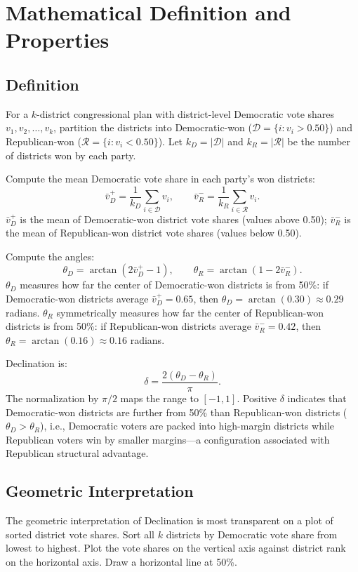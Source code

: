 \section{Mathematical Definition and Properties}
\label{sec:definition}

\subsection{Definition}

For a $k$-district congressional plan with district-level Democratic vote shares
$v_1, v_2, \ldots, v_k$, partition the districts into Democratic-won ($\mathcal{D} =
\{i : v_i > 0.50\}$) and Republican-won ($\mathcal{R} = \{i : v_i < 0.50\}$). Let
$k_D = |\mathcal{D}|$ and $k_R = |\mathcal{R}|$ be the number of districts won
by each party.

Compute the mean Democratic vote share in each party's won districts:
\[
\bar{v}_D^+ = \frac{1}{k_D}\sum_{i \in \mathcal{D}} v_i, \qquad
\bar{v}_R^- = \frac{1}{k_R}\sum_{i \in \mathcal{R}} v_i.
\]
$\bar{v}_D^+$ is the mean of Democratic-won district vote shares (values above 0.50);
$\bar{v}_R^-$ is the mean of Republican-won district vote shares (values below 0.50).

Compute the angles:
\[
\theta_D = \arctan(2\bar{v}_D^+ - 1), \qquad \theta_R = \arctan(1 - 2\bar{v}_R^-).
\]
$\theta_D$ measures how far the center of Democratic-won districts is from 50\%:
if Democratic-won districts average $\bar{v}_D^+ = 0.65$, then $\theta_D = \arctan(0.30)
\approx 0.29$ radians. $\theta_R$ symmetrically measures how far the center of
Republican-won districts is from 50\%: if Republican-won districts average
$\bar{v}_R^- = 0.42$, then $\theta_R = \arctan(0.16) \approx 0.16$ radians.

Declination is:
\[
\delta = \frac{2(\theta_D - \theta_R)}{\pi}.
\]
The normalization by $\pi/2$ maps the range to $[-1, 1]$. Positive $\delta$ indicates
that Democratic-won districts are further from 50\% than Republican-won districts
($\theta_D > \theta_R$), i.e., Democratic voters are packed into high-margin
districts while Republican voters win by smaller margins---a configuration associated
with Republican structural advantage.

\subsection{Geometric Interpretation}

The geometric interpretation of Declination is most transparent on a plot of sorted
district vote shares. Sort all $k$ districts by Democratic vote share from lowest
to highest. Plot the vote shares on the vertical axis against district rank on the
horizontal axis. Draw a horizontal line at 50\%.

